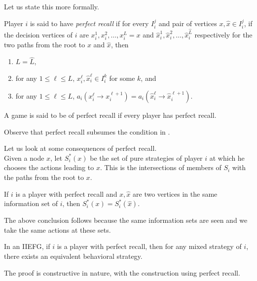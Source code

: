 	Let us state this more formally.

	\begin{fdef}
		Player $i$ is said to have \emph{perfect recall} if for every $I_i^j$ and pair of vertices $x,\hat{x} \in I_i^j$, if the decision vertices of $i$ are $x_i^1,x_i^2,\ldots,x_i^L = x$ and $\hat{x}_i^1,\hat{x}_i^2,\ldots,\hat{x}_i^{\hat{L}}$ respectively for the two paths from the root to $x$ and $\hat{x}$, then
		\begin{enumerate}
			\item $L = \hat{L}$,
			\item for any $1 \le \ell \le L$, $x_i^\ell,\hat{x}_i^\ell \in I_i^k$ for some $k$, and
			\item for any $1 \le \ell \le L$, $a_i(x_i^\ell \to x_i^{\ell+1}) = a_i(\hat{x}_i^\ell \to \hat{x}_i^{\ell+1})$.
		\end{enumerate}
		A game is said to be of perfect recall if every player has perfect recall.
	\end{fdef}

	Observe that perfect recall subsumes the condition in .

	Let us look at some consequences of perfect recall.\\
	Given a node $x$, let $S_i^*(x)$ be the set of pure strategies of player $i$ at which he chooses the actions leading to $x$. This is the intersections of members of $S_i$ with the paths from the root to $x$.
	\begin{ftheo}
		If $i$ is a player with perfect recall and $x,\hat{x}$ are two vertices in the same information set of $i$, then $S_i^*(x) = S_i^*(\hat{x})$.
	\end{ftheo}

	The above conclusion follows because the same information sets are seen and we take the same actions at these sets.

	\begin{ftheo}[Kuhn]
		In an IIEFG, if $i$ is a player with perfect recall, then for any mixed strategy of $i$, there exists an equivalent behavioral strategy.
	\end{ftheo}
	The proof is constructive in nature, with the construction using perfect recall.